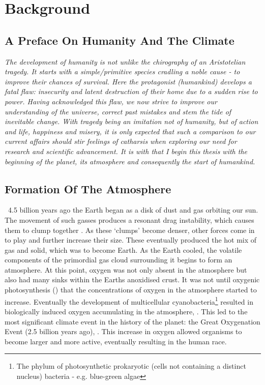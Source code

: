 \section{Background}
\subsection{A Preface On Humanity And The Climate}
\begin{flushleft}\emph{
The development of humanity is not unlike the chirography of an Aristotelian tragedy. It starts with a simple/primitive species cradling a noble cause - to improve their chances of survival. Here the protagonist (humankind) develops a fatal flaw: insecurity and latent destruction of their home due to a sudden rise to power.
Having acknowledged this flaw, we now strive to improve our understanding of the universe, correct past mistakes and stem the tide of inevitable change. \vspace{\baselineskip}\linebreak
With tragedy being an imitation not of humanity, but of action and life, happiness and misery, it is only expected that such a comparison to our current affairs should stir feelings of catharsis when exploring our need for research and scientific advancement.
It is with that I begin this thesis with the beginning of the planet, its atmosphere and consequently the start of humankind.
}
\end{flushleft}


\subsection{Formation Of The Atmosphere}
 ~4.5 billion years ago the Earth began as a disk of dust and gas orbiting our sun. The movement of such gasses produces a resonant drag instability, which causes them to clump together \citep{drag,planet}. As these `clumps' become denser, other forces come in to play and further increase their size. These eventually produced the hot mix of gas and solid, which was to become Earth.
 As the Earth cooled, the volatile components of the primordial gas cloud surrounding it begins to form an atmosphere. %
At this point, oxygen was not only absent in the atmosphere but also had many sinks within the Earths anoxidised crust. It was not until oxygenic photosynthesis (\citep{oxygenicphotosynthesis}) that the concentrations of oxygen in the atmosphere started to increase. Eventually the development of multicellular cyanobacteria\footnote{The phylum of photosynthetic prokaryotic (cells not containing a distinct nucleus) bacteria - e.g. blue-green algae} resulted in biologically induced oxygen accumulating in the atmosphere, \citep{multicellular}. This led to the most significant climate event in the history of the planet: the Great Oxygenation Event (2.5 billion years ago), \citep{oxidation}. This increase in oxygen allowed organisms to become larger and more active, eventually resulting in the human race.


